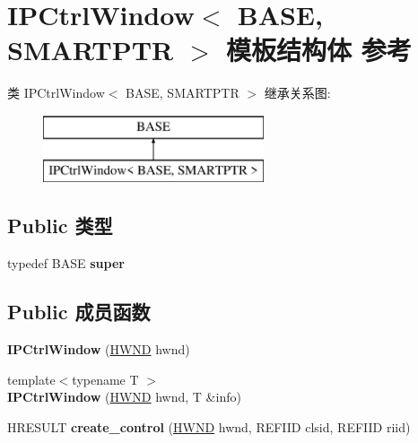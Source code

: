 \hypertarget{struct_i_p_ctrl_window}{}\section{I\+P\+Ctrl\+Window$<$ B\+A\+SE, S\+M\+A\+R\+T\+P\+TR $>$ 模板结构体 参考}
\label{struct_i_p_ctrl_window}
类 I\+P\+Ctrl\+Window$<$ B\+A\+SE, S\+M\+A\+R\+T\+P\+TR $>$ 继承关系图\+:\begin{figure}[H]
\begin{center}
\leavevmode
\includegraphics[height=2.000000cm]{struct_i_p_ctrl_window}
\end{center}
\end{figure}
\subsection*{Public 类型}
\begin{DoxyCompactItemize}
\item 
\mbox{\label{struct_i_p_ctrl_window_a30d95939dea9d153e203c0a4485c24f2}} 
typedef B\+A\+SE {\bfseries super}
\end{DoxyCompactItemize}
\subsection*{Public 成员函数}
\begin{DoxyCompactItemize}
\item 
\mbox{\label{struct_i_p_ctrl_window_ad6f1d3aa8a6afe5b22c63feba1f50882}} 
{\bfseries I\+P\+Ctrl\+Window} (\hyperlink{interfacevoid}{H\+W\+ND} hwnd)
\item 
\mbox{\label{struct_i_p_ctrl_window_aadcb9fbcdf5205728cb6fb8a6738eaa2}} 
{\footnotesize template$<$typename T $>$ }\\{\bfseries I\+P\+Ctrl\+Window} (\hyperlink{interfacevoid}{H\+W\+ND} hwnd, T \&info)
\item 
\mbox{\label{struct_i_p_ctrl_window_ab06ccfcf40bc9ea54f4644f5fe184ff6}} 
H\+R\+E\+S\+U\+LT {\bfseries create\+\_\+control} (\hyperlink{interfacevoid}{H\+W\+ND} hwnd, R\+E\+F\+I\+ID clsid, R\+E\+F\+I\+ID riid)
\end{DoxyCompactItemize}
